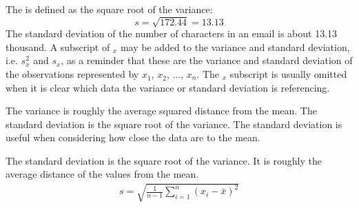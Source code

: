 The  is defined as the square root of the variance:
$$s=\sqrt{172.44} = 13.13$$
The standard deviation of the number of characters in an email is about 13.13 thousand. A subscript of $_x$ may be added to the variance and standard deviation, i.e. $s_x^2$ and $s_x^{}$, as a reminder that these are the variance and standard deviation of the observations represented by $x_1^{}$, $x_2^{}$, ..., $x_n^{}$. The $_{x}$ subscript is usually omitted when it is clear which data the variance or standard deviation is referencing.  


\begin{termBox}{
The variance is roughly the average squared distance from the mean. The standard deviation is the square root of the variance. The standard deviation is useful when considering how close the data are to the mean.}
\end{termBox}

\begin{termBox}{
The standard deviation is the square root of the variance. It is roughly the average distance of the values from the mean. 
\begin{eqnarray}
\label{sdEquation}
s = \sqrt{\frac{1}{n-1} \sum_{i=1}^{n}(x_i -  \bar{x})^2}
\end{eqnarray}
}
\end{termBox}

